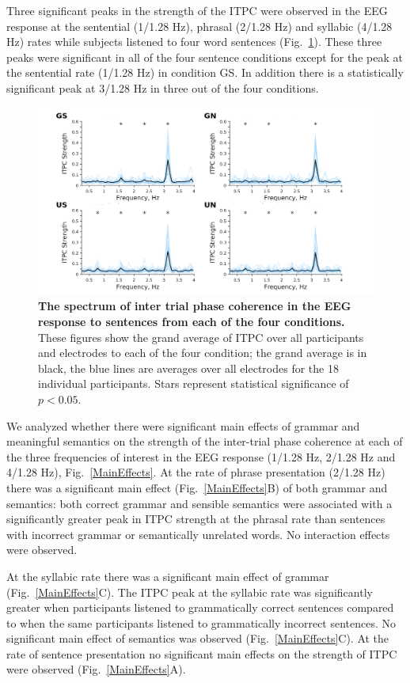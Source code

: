 \documentclass[a4paper,10pt,twoside]{article}
\begin{document}
Three significant peaks in the strength of the ITPC were observed in
the EEG response at the sentential (1/1.28 Hz), phrasal (2/1.28 Hz)
and syllabic (4/1.28 Hz) rates while subjects listened to four word
sentences (Fig.~\ref{Fig1}). These three peaks were significant in all
of the four sentence conditions except for the peak at the sentential
rate (1/1.28 Hz) in condition GS. In addition there is a
statistically significant peak at 3/1.28 Hz in three out of the four
conditions.

\begin{figure}[tbp]
\includegraphics[width=\linewidth]{ITPC_by_condition.png}
\caption{\textbf{The spectrum of inter trial phase coherence in the
    EEG response to sentences from each of the four conditions.} These
  figures show the grand average of ITPC over all participants and
  electrodes to each of the four condition; the grand average is in
  black, the blue lines are averages over all electrodes for the 18
  individual participants. Stars represent statistical significance of
  $p<0.05$.}
\label{Fig1}
\end{figure}

We analyzed whether there were significant main effects of grammar and
meaningful semantics on the strength of the inter-trial phase
coherence at each of the three frequencies of interest in the EEG
response (1/1.28 Hz, 2/1.28 Hz and 4/1.28 Hz),
Fig.~\ref{MainEffects}. At the rate of phrase presentation (2/1.28 Hz)
there was a significant main effect (Fig.~\ref{MainEffects}B) of both
grammar and semantics: both correct grammar and sensible semantics
were associated with a significantly greater peak in ITPC strength at
the phrasal rate than sentences with incorrect grammar or semantically
unrelated words. No interaction effects were observed.

At the syllabic rate there was a significant main effect of grammar
(Fig.~\ref{MainEffects}C). The ITPC peak at the syllabic rate was
significantly greater when participants listened to grammatically
correct sentences compared to when the same participants listened to
grammatically incorrect sentences. No significant main
effect of semantics was observed (Fig.~\ref{MainEffects}C). At the
rate of sentence presentation no significant main effects on the
strength of ITPC were observed (Fig.~\ref{MainEffects}A).
\end{document}
